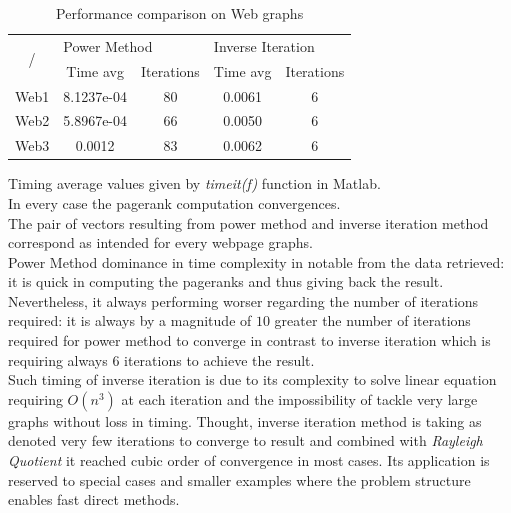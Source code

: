 \documentclass[unicode,11pt,a4paper,oneside,numbers=endperiod,openany]{scrartcl}
\begin{document}
\begin{table}[H]
    \centering
    \begin{tabular}{||ccccc||}
        \hline

        \multicolumn{1}{|c|}{\multirow{2}{*}{/}}
             & \multicolumn{2}{l|}{Power Method} & \multicolumn{2}{l|}{Inverse Iteration}              \\ [0.5ex] \cline{2-5}

        \multicolumn{1}{|c|}{}
             & \multicolumn{1}{|c|}{Time avg}    & \multicolumn{1}{|c|}{Iterations}
             & \multicolumn{1}{|c|}{Time avg}    & \multicolumn{1}{|c|}{Iterations}                    \\

        \hline\hline

        Web1 & 8.1237e-04                        & 80                                     & 0.0061 & 6 \\
        Web2 & 5.8967e-04                        & 66                                     & 0.0050 & 6 \\
        Web3 & 0.0012                            & 83                                     & 0.0062 & 6 \\ [1ex]
        \hline
    \end{tabular}
    \caption{Performance comparison on Web graphs}
    \label{tab:ex4p4_comparison}
\end{table}

Timing average values given by \textit{timeit(f)} function in Matlab. \\
In every case the pagerank computation convergences. \\
The pair of vectors resulting from power method and inverse iteration method
correspond as intended for every webpage graphs. \\

Power Method dominance in time complexity in notable from the data retrieved:
it is quick in computing the pageranks and thus giving back the result. \\
Nevertheless, it always performing worser regarding the number of iterations required:
it is always by a magnitude of $10$ greater the number of iterations required
for power method to converge in contrast to inverse iteration which is requiring always $6$ iterations
to achieve the result. \\

Such timing of inverse iteration is due to its complexity to solve linear equation requiring $O(n^3)$
at each iteration and the impossibility of tackle very large graphs without loss in timing.
Thought, inverse iteration method is taking as denoted very few iterations to converge to result
and combined with \textit{Rayleigh Quotient} it reached cubic order of convergence in most cases.
Its application is reserved to special cases and smaller examples where the problem structure enables fast direct methods.
\end{document}
